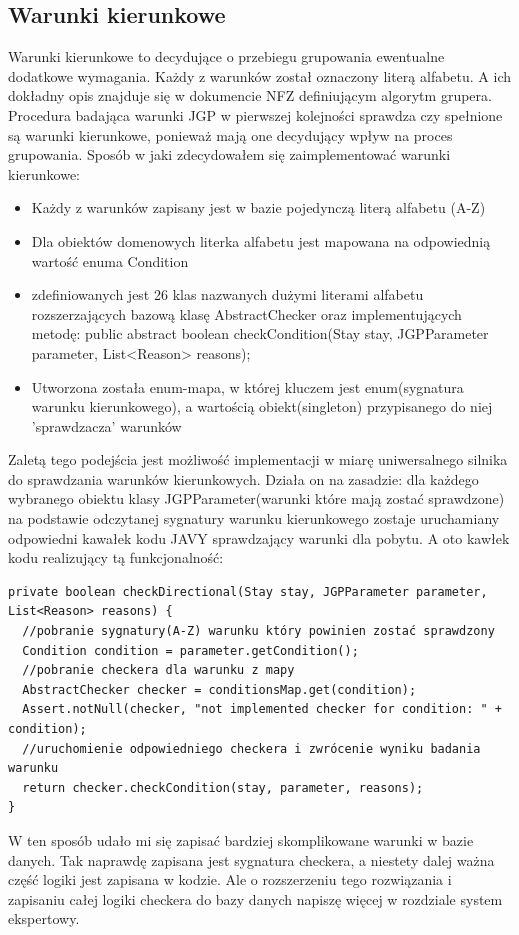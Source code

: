 \subsection{Warunki kierunkowe}
\label{sec:warunkiKierunkowe}
Warunki kierunkowe to decydujące o przebiegu grupowania ewentualne dodatkowe wymagania. Każdy z warunków został oznaczony literą alfabetu. A ich  dokładny opis znajduje się w dokumencie NFZ definiującym algorytm grupera. Procedura badająca warunki JGP w pierwszej kolejności sprawdza czy spełnione są warunki kierunkowe, ponieważ mają one decydujący wpływ na proces grupowania.
Sposób w jaki zdecydowałem się zaimplementować warunki kierunkowe:
\begin{itemize}
\item Każdy z warunków zapisany jest w bazie pojedynczą literą alfabetu (A-Z)
\item Dla obiektów domenowych literka alfabetu jest mapowana na odpowiednią wartość enuma Condition
\item zdefiniowanych jest 26 klas nazwanych dużymi literami alfabetu rozszerzających bazową klasę AbstractChecker oraz implementujących metodę:
  public abstract boolean checkCondition(Stay stay, JGPParameter parameter, List<Reason> reasons);
\item Utworzona została enum-mapa, w której kluczem jest enum(sygnatura warunku kierunkowego), a wartością obiekt(singleton) przypisanego do niej 'sprawdzacza' warunków
\end{itemize}
Zaletą tego podejścia jest możliwość implementacji w miarę uniwersalnego silnika do sprawdzania warunków kierunkowych. Działa on na zasadzie: dla każdego wybranego obiektu klasy JGPParameter(warunki które mają zostać sprawdzone) na podstawie odczytanej sygnatury warunku kierunkowego zostaje uruchamiany odpowiedni kawałek kodu JAVY sprawdzający warunki dla pobytu. A oto kawłek kodu realizujący tą funkcjonalność:
\scriptsize
\begin{verbatim}
private boolean checkDirectional(Stay stay, JGPParameter parameter, List<Reason> reasons) {
  //pobranie sygnatury(A-Z) warunku który powinien zostać sprawdzony
  Condition condition = parameter.getCondition();
  //pobranie checkera dla warunku z mapy
  AbstractChecker checker = conditionsMap.get(condition);
  Assert.notNull(checker, "not implemented checker for condition: " + condition);
  //uruchomienie odpowiedniego checkera i zwrócenie wyniku badania warunku
  return checker.checkCondition(stay, parameter, reasons);
}
\end{verbatim}
\normalsize
W ten sposób udało mi się zapisać bardziej skomplikowane warunki w bazie danych. Tak naprawdę zapisana jest sygnatura checkera, a niestety dalej ważna część logiki jest zapisana w kodzie. Ale o rozszerzeniu tego rozwiązania  i zapisaniu całej logiki checkera do bazy danych napiszę więcej w rozdziale system ekspertowy.

